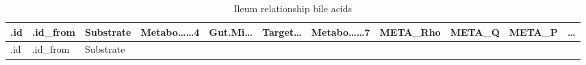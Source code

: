 \documentclass[
]{article}
\begin{document}
\begin{longtable}[]{@{}lllllllllll@{}}
\caption{\label{tab:Ileum-relationship-bile-acids}Ileum relationship bile acids}\tabularnewline
\toprule
\begin{minipage}[b]{0.05\columnwidth}\raggedright
.id\strut
\end{minipage} & \begin{minipage}[b]{0.07\columnwidth}\raggedright
.id\_from\strut
\end{minipage} & \begin{minipage}[b]{0.07\columnwidth}\raggedright
Substrate\strut
\end{minipage} & \begin{minipage}[b]{0.09\columnwidth}\raggedright
Metabo\ldots\ldots4\strut
\end{minipage} & \begin{minipage}[b]{0.07\columnwidth}\raggedright
Gut.Mi\ldots{}\strut
\end{minipage} & \begin{minipage}[b]{0.07\columnwidth}\raggedright
Target\ldots{}\strut
\end{minipage} & \begin{minipage}[b]{0.09\columnwidth}\raggedright
Metabo\ldots\ldots7\strut
\end{minipage} & \begin{minipage}[b]{0.07\columnwidth}\raggedright
META\_Rho\strut
\end{minipage} & \begin{minipage}[b]{0.07\columnwidth}\raggedright
META\_Q\strut
\end{minipage} & \begin{minipage}[b]{0.07\columnwidth}\raggedright
META\_P\strut
\end{minipage} & \begin{minipage}[b]{0.03\columnwidth}\raggedright
\ldots{}\strut
\end{minipage}\tabularnewline
\midrule
\endfirsthead
\toprule
\begin{minipage}[b]{0.05\columnwidth}\raggedright
.id\strut
\end{minipage} & \begin{minipage}[b]{0.07\columnwidth}\raggedright
.id\_from\strut
\end{minipage} & \begin{minipage}[b]{0.07\columnwidth}\raggedright
Substrate\strut
\end{minipage} & \begin{minipage}[b]{0.09\columnwidth}\raggedright

\end{minipage}
\end{longtable}
\end{document}
